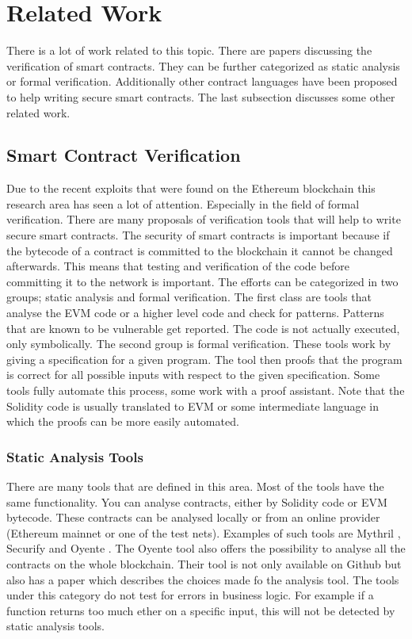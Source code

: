 \documentclass[a4paper]{article}
\begin{document}
\section{Related Work}
\label{sec:RelatedWork}
There is a lot of work related to this topic. There are papers discussing the verification of smart contracts. They can be further categorized as static analysis or formal verification. Additionally other contract languages have been proposed to help writing secure smart contracts. The last subsection discusses some other related work.

\subsection{Smart Contract Verification}
Due to the recent exploits that were found on the Ethereum blockchain this research area has seen a lot of attention. Especially in the field of formal verification. There are many proposals of verification tools that will help to write secure smart contracts. The security of smart contracts is important because if the bytecode of a contract is committed to the blockchain it cannot be changed afterwards. This means that testing and verification of the code before committing it to the network is important. The efforts can be categorized in two groups; static analysis and formal verification. The first class are tools that analyse the EVM code or a higher level code and check for patterns. Patterns that are known to be vulnerable get reported. The code is not actually executed, only symbolically. The second group is formal verification. These tools work by giving a specification for a given program. The tool then proofs that the program is correct for all possible inputs with respect to the given specification. Some tools fully automate this process, some work with a proof assistant. Note that the Solidity code is usually translated to EVM or some intermediate language in which the proofs can be more easily automated.
\subsubsection{Static Analysis Tools}
There are many tools that are defined in this area. Most of the tools have the same functionality. You can analyse contracts, either by Solidity code or EVM bytecode. These contracts can be analysed locally or from an online provider (Ethereum mainnet or one of the test nets). Examples of such tools are Mythril \cite{mythrilrepo}, Securify \cite{securifywebsite} and Oyente \cite{luu2016making}. The Oyente tool also offers the possibility to analyse all the contracts on the whole blockchain. Their tool is not only available on Github but also has a paper which describes the choices made fo the analysis tool. The tools under this category do not test for errors in business logic. For example if a function returns too much ether on a specific input, this will not be detected by static analysis tools. 
\end{document}
